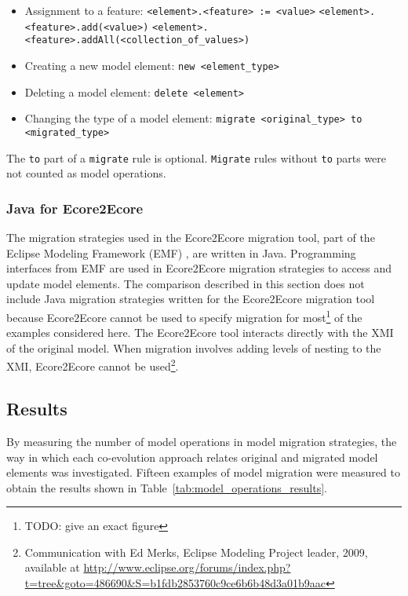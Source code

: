 \begin{itemize}
	\item Assignment to a feature:
	\subitem \texttt{<element>.<feature> := <value>} 
	\subitem \texttt{<element>.<feature>.add(<value>)}
	\subitem \texttt{<element>.<feature>.addAll(<collection\_of\_values>)}

	\item Creating a new model element:
	\subitem \texttt{new <element\_type>}
	
	\item Deleting a model element:
	\subitem \texttt{delete <element>}
	
	\item Changing the type of a model element:
	\subitem \texttt{migrate <original_type> to <migrated_type>}
\end{itemize}

The \texttt{to} part of a \texttt{migrate} rule is optional. \texttt{Migrate} rules without \texttt{to} parts were not counted as model operations.


\subsubsection{Java for Ecore2Ecore}
The migration strategies used in the Ecore2Ecore migration tool, part of the Eclipse Modeling Framework (EMF) \cite{steinberg09emf}, are written in Java. Programming interfaces from EMF are used in Ecore2Ecore migration strategies to access and update model elements. The comparison described in this section does not include Java migration strategies written for the Ecore2Ecore migration tool because Ecore2Ecore cannot be used to specify migration for most\footnote{TODO: give an exact figure} of the examples considered here. The Ecore2Ecore tool interacts directly with the XMI of the original model. When migration involves adding levels of nesting to the XMI, Ecore2Ecore cannot be used\footnote{Communication with Ed Merks, Eclipse Modeling Project leader, 2009, available at \url{http://www.eclipse.org/forums/index.php?t=tree&goto=486690&S=b1fdb2853760c9ce6b6b48d3a01b9aac}}. 


\subsection{Results}
\label{subsec:quantitive_results}
By measuring the number of model operations in model migration strategies, the way in which each co-evolution approach relates original and migrated model elements was investigated. Fifteen examples of model migration were measured to obtain the results shown in Table~\ref{tab:model_operations_results}. 

